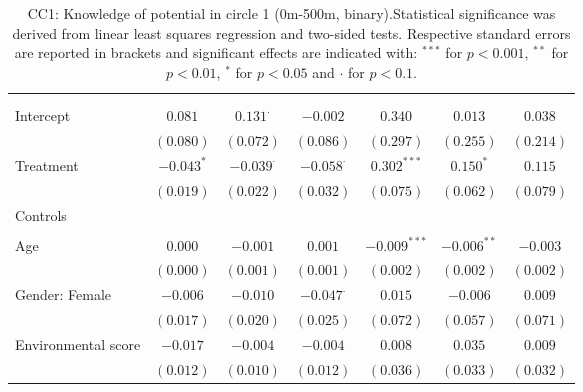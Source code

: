 \begin{center}
\begin{small}
\begin{longtable}{l@{} c@{} c@{} c@{} c@{} c@{} c@{}}
\hline
\endhead
\hline
\endfoot
\hline
\multicolumn{7}{l}{\tiny{
}}\\
\caption{CC1: Knowledge of potential in circle 1 (0m-500m, binary).Statistical significance was derived from linear least squares regression and two-sided tests. Respective standard errors are reported in brackets and significant effects are indicated with: $^{***}$ for $p < 0.001$, $^{**}$ for $p < 0.01$, $^*$ for $p < 0.05$ and $\cdot$ for $p < 0.1$.}
\label{table:coefficients}
\endlastfoot \\
Intercept                           & $0.081$      & $0.131^{\cdot}$  & $-0.002$         & $0.340$        & $0.013$         & $0.038$     \\
                                    & $(0.080)$    & $(0.072)$        & $(0.086)$        & $(0.297)$      & $(0.255)$       & $(0.214)$   \\
Treatment                           & $-0.043^{*}$ & $-0.039^{\cdot}$ & $-0.058^{\cdot}$ & $0.302^{***}$  & $0.150^{*}$     & $0.115$     \\
                                    & $(0.019)$    & $(0.022)$        & $(0.032)$        & $(0.075)$      & $(0.062)$       & $(0.079)$   \\
Controls                            &              &                  &                  &                &                 &             \\
                                    &              &                  &                  &                &                 &             \\
\quad Age                           & $0.000$      & $-0.001$         & $0.001$          & $-0.009^{***}$ & $-0.006^{**}$   & $-0.003$    \\
                                    & $(0.000)$    & $(0.001)$        & $(0.001)$        & $(0.002)$      & $(0.002)$       & $(0.002)$   \\
\quad Gender: Female                & $-0.006$     & $-0.010$         & $-0.047^{\cdot}$ & $0.015$        & $-0.006$        & $0.009$     \\
                                    & $(0.017)$    & $(0.020)$        & $(0.025)$        & $(0.072)$      & $(0.057)$       & $(0.071)$   \\
\quad Environmental score           & $-0.017$     & $-0.004$         & $-0.004$         & $0.008$        & $0.035$         & $0.009$     \\
                                    & $(0.012)$    & $(0.010)$        & $(0.012)$        & $(0.036)$      & $(0.033)$       & $(0.032)$   \\

\end{longtable}
\end{small}
\end{center}
